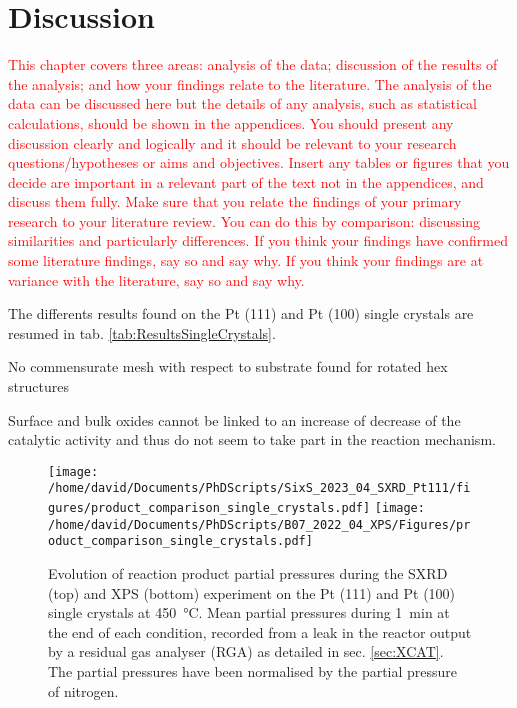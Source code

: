 \section{Discussion}

\textcolor{red}{This chapter covers three areas: analysis of the data; discussion of the results of the analysis; and how your findings relate to the literature. The analysis of the data can be discussed here but the details of any analysis, such as statistical calculations, should be shown in the appendices. You should present any discussion clearly and logically and it should be relevant to your research questions/hypotheses or aims and objectives. Insert any tables or figures that you decide are important in a relevant part of the text not in the appendices, and discuss them fully. Make sure that you relate the findings of your primary research to your literature review. You can do this by comparison: discussing similarities and particularly differences. If you think your findings have confirmed some literature findings, say so and say why. If you think your findings are at variance with the literature, say so and say why.}

The differents results found on the Pt (111) and Pt (100) single crystals are resumed in tab. \ref{tab:ResultsSingleCrystals}.


No commensurate mesh with respect to substrate found for rotated hex structures


Surface and bulk oxides cannot be linked to an increase of decrease of the catalytic activity and thus do not seem to take part in the reaction mechanism.

\begin{figure}[!htb]
    \centering
    \texttt{[image: /home/david/Documents/PhDScripts/SixS\_2023\_04\_SXRD\_Pt111/figures/product\_comparison\_single\_crystals.pdf]}
    \texttt{[image: /home/david/Documents/PhDScripts/B07\_2022\_04\_XPS/Figures/product\_comparison\_single\_crystals.pdf]}
    \caption{
        Evolution of reaction product partial pressures during the SXRD (top) and XPS (bottom) experiment on the Pt (111) and Pt (100) single crystals at \qty{450}{\degreeCelsius}.
        Mean partial pressures during \qty{1}{\minute} at the end of each condition, recorded from a leak in the reactor output by a residual gas analyser (RGA) as detailed in sec. \ref{sec:XCAT}.
        The partial pressures have been normalised by the partial pressure of nitrogen.
    }
    \label{fig:RGA450Pt111AndPt100}
\end{figure}

